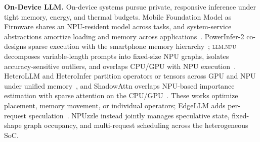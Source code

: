 \documentclass[sigconf,nonacm,10pt]{acmart}
\newcommand{\name}{NPUzzle\xspace}
\begin{document}
{{\noindent\textbf{On-Device LLM.} On-device systems pursue private, responsive inference under tight memory, energy, and thermal budgets. Mobile Foundation Model as Firmware shares an NPU-resident model across tasks, and system-service abstractions amortize loading and memory across applications~\cite{yuan2024mobilefoundation,yin2024systemservice}. PowerInfer-2 co-designs sparse execution with the smartphone memory hierarchy~\cite{xue2024powerinfer2}; \textsc{llm.npu} decomposes variable-length prompts into fixed-size NPU graphs, isolates accuracy-sensitive outliers, and overlaps CPU/GPU with NPU execution~\cite{xu2025fastondevice}. HeteroLLM and HeteroInfer partition operators or tensors across GPU and NPU under unified memory~\cite{chen2025heterollm,chen2025heteroinfer}, and ShadowAttn overlaps NPU-based importance estimation with sparse attention on the CPU/GPU~\cite{yin2025shadowattn}. These works optimize placement, memory movement, or individual operators; EdgeLLM adds per-request speculation~\cite{xu2025edgellm}. \name instead jointly manages speculative state, fixed-shape graph occupancy, and multi-request scheduling across the heterogeneous SoC.

}}
\end{document}
